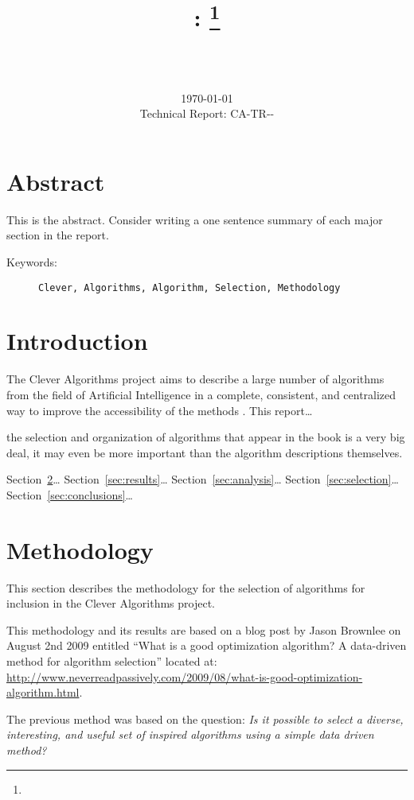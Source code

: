 \documentclass[a4paper, 11pt]{article}
\title{{\myreporttitle}: {\myreportsubtitle}\footnote{\myreportlicense}}
\author{\myreportauthor\\{\myreportemail}\\\small\myreportproject}
\date{\today\\{\small{Technical Report: CA-TR-{\myreportdate}-\myreportversion}}}
\begin{document}
\maketitle

\section*{Abstract} 
This is the abstract. Consider writing a one sentence summary of each major section in the report.

\begin{description}
	\item[Keywords:] {\small\texttt{Clever, Algorithms, Algorithm, Selection, Methodology}}
\end{description} 

\section{Introduction}
\label{sec:introduction}
The Clever Algorithms project aims to describe a large number of algorithms from the field of Artificial Intelligence in a complete, consistent, and centralized way to improve the accessibility of the methods \cite{Brownlee2010}. 
This report\ldots

the selection and organization of algorithms that appear in the book is a very big deal, it may even be more important than the algorithm descriptions themselves.

Section~\ref{sec:methodology}\ldots
Section~\ref{sec:results}\ldots
Section~\ref{sec:analysis}\ldots
Section~\ref{sec:selection}\ldots
Section~\ref{sec:conclusions}\ldots

% 
% 
\section{Methodology}
\label{sec:methodology}
This section describes the methodology for the selection of algorithms for inclusion in the Clever Algorithms project.

This methodology and its results are based on a blog post by Jason Brownlee on August 2nd 2009 entitled ``What is a good optimization algorithm? A data-driven method for algorithm selection'' located at: \url{http://www.neverreadpassively.com/2009/08/what-is-good-optimization-algorithm.html}.

The previous method was based on the question: \emph{Is it possible to select a diverse, interesting, and useful set of inspired algorithms using a simple data driven method?}
\end{document}
